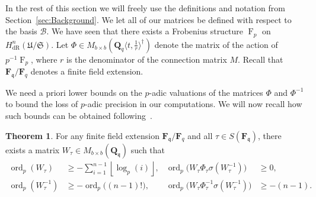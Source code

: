 \documentclass[a4paper,11pt]{article}
\numberwithin{equation}{section}
\providecommand{\floor}[1]{\left\lfloor#1\right\rfloor}   %
\newcommand{\QQ}{\mathbf{Q}} %
\newcommand{\FF}{\mathbf{F}} %
\DeclareMathOperator{\ord}{ord}          %
\DeclareMathOperator{\Frob}{F}           %
\providecommand{\HdR}{H_{\text{dR}}}    %
\providecommand{\cB}{\mathcal{B}} %
\theoremstyle{definition}
\newtheorem{thm}{Theorem}[section]
\begin{document}
In the rest of this section we will freely use the definitions and notation 
from Section~\ref{sec:Background}. We let all of our matrices be defined with 
respect to the basis $\cB$. We have seen that there exists a Frobenius 
structure $\Frob_p$ on $\HdR^n(\mathfrak{U}/\mathfrak{S})$. Let 
$\Phi \in M_{b \times b}(\QQ_q \langle t, \frac{1}{r} \rangle^{\dag})$ 
denote the matrix of the action of $p^{-1}\Frob_p$, where $r$ is the 
denominator of the connection matrix $M$. Recall that 
$\FF_{\mathfrak{q}}/\FF_q$ 
denotes a finite field extension. 

We need a priori lower bounds on the $p$-adic valuations of the matrices 
$\Phi$ and $\Phi^{-1}$ to bound the loss of $p$-adic precision in our 
computations. We will now recall how such bounds can be obtained 
following~\citep{AbbottKedlayaRoe2006}.

\begin{thm} \label{thm:deltabound}
For any finite field extension $\FF_{\mathfrak{q}}/\FF_q$ and
all $\tau \in S(\FF_{\mathfrak{q}})$, 
there exists a matrix $W_{\tau} \in M_{b \times b}(\QQ_{\mathfrak{q}})$ such that 
\begin{align*}
\ord_p(W_{\tau}) &\geq -\sum_{i=1}^{n-1} \floor{\log_p(i)},
&\ord_p\bigl(W_{\tau} \Phi_{\tau} \sigma(W_{\tau}^{-1})\bigr) &\geq  0, \\
\ord_p(W_{\tau}^{-1}) &\geq -\ord_p \bigl((n-1)! \bigr),
&\ord_p\bigl(W_{\tau} \Phi_{\tau}^{-1} \sigma(W_{\tau}^{-1})\bigr) &\geq  -(n-1).
\end{align*}
\end{thm}
\end{document}
